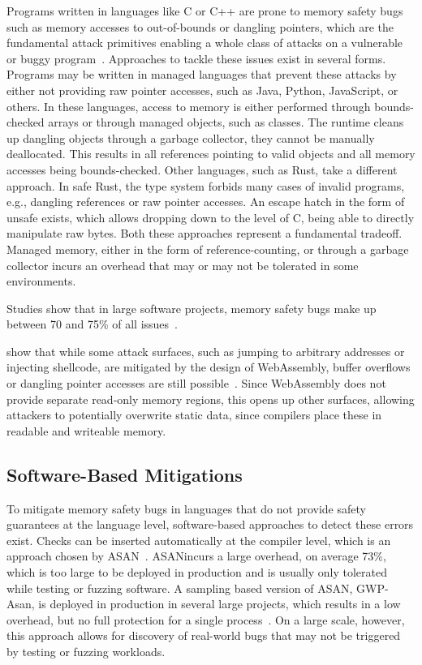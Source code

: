 Programs written in languages like C or C++ are prone to memory safety bugs such as memory accesses to out-of-bounds or dangling pointers, which are the fundamental attack primitives enabling a whole class of attacks on a vulnerable or buggy program~\cite{szekeres2013sok}.
Approaches to tackle these issues exist in several forms.
Programs may be written in managed languages that prevent these attacks by either not providing raw pointer accesses, such as Java, Python, JavaScript, or others.
In these languages, access to memory is either performed through bounds-checked arrays or through managed objects, such as classes.
The runtime cleans up dangling objects through a garbage collector, they cannot be manually deallocated.
This results in all references pointing to valid objects and all memory accesses being bounds-checked.
Other languages, such as Rust, take a different approach.
In safe Rust, the type system forbids many cases of invalid programs, e.g., dangling references or raw pointer accesses.
An escape hatch in the form of unsafe exists, which allows dropping down to the level of C, being able to directly manipulate raw bytes.
Both these approaches represent a fundamental tradeoff.
Managed memory, either in the form of reference-counting, or through a garbage collector incurs an overhead that may or may not be tolerated in some environments.

Studies show that in large software projects, memory safety bugs make up between 70 and 75\% of all issues~\cite{chromium_memory_safety,microsoft_memory_safety,android_memory_safety}.

\citeauthor*{lehmann2020everything} show that while some attack surfaces, such as jumping to arbitrary addresses or injecting shellcode, are mitigated by the design of WebAssembly, buffer overflows or dangling pointer accesses are still possible~\cite{lehmann2020everything}.
Since WebAssembly does not provide separate read-only memory regions, this opens up other surfaces, allowing attackers to potentially overwrite static data, since compilers place these in readable and writeable memory.

\subsection{Software-Based Mitigations}
\label{subsec:software-based-mitigations}

To mitigate memory safety bugs in languages that do not provide safety guarantees at the language level, software-based approaches to detect these errors exist.
Checks can be inserted automatically at the compiler level, which is an approach chosen by \ac{ASAN}~\cite{serebryany2012addresssanitizer}.
\ac{ASAN}incurs a large overhead, on average 73\%, which is too large to be deployed in production and is usually only tolerated while testing or fuzzing software.
A sampling based version of \ac{ASAN}, GWP-Asan, is deployed in production in several large projects, which results in a low overhead, but no full protection for a single process~\cite{serebryany2023gwp}.
On a large scale, however, this approach allows for discovery of real-world bugs that may not be triggered by testing or fuzzing workloads.

